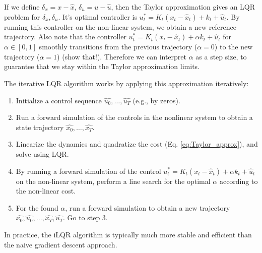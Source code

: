 If we define $\delta_x = x - \hat{x}$, $\delta_u = u - \hat{u}$, then the Taylor approximation gives an LQR problem for $\delta_x, \delta_u$. It's optimal controller is $u_t^* = K_t (x_t - \hat{x}_t) + k_t + \hat{u}_t.$ By running this controller on the non-linear system, we obtain a new reference trajectory. 
Also note that the controller $u_t^* = K_t (x_t - \hat{x}_t) + \alpha k_t + \hat{u}_t$ for $\alpha \in [0,1]$ smoothly transitions from the previous trajectory ($\alpha=0$) to the new trajectory ($\alpha=1$) (show that!). Therefore we can interpret $\alpha$ as a step size, to guarantee that we stay within the Taylor approximation limits.

The iterative LQR algorithm works by applying this approximation iteratively:

\begin{enumerate}
    \item Initialize a control sequence $\hat{u_0},\dots,\hat{u_T}$ (e.g., by zeros).
    \item Run a forward simulation of the controls in the nonlinear system to obtain a state trajectory $\hat{x_0},\dots,\hat{x_T}$.
    \item Linearize the dynamics and quadratize the cost (Eq. \ref{eq:Taylor_approx}), and solve using LQR.
    \item By running a forward simulation of the control $u_t^* = K_t (x_t - \hat{x}_t) + \alpha k_t + \hat{u}_t$ on the non-linear system, perform a line search for the optimal $\alpha$ according to the non-linear cost.
    \item For the found $\alpha$, run a forward simulation to obtain a new trajectory  $\hat{x_0},\hat{u_0},\dots,\hat{x_T},\hat{u_T}$. Go to step 3.
\end{enumerate}

In practice, the iLQR algorithm is typically much more stable and efficient than the naive gradient descent approach.
